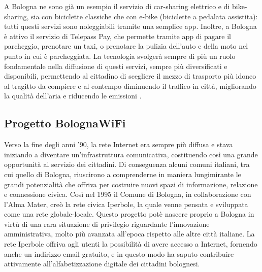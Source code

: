 A Bologna ne sono già un esempio il servizio di car-sharing elettrico e di bike-sharing, sia con biciclette classiche che con e-bike (biciclette a pedalata assistita): tutti questi servizi sono noleggiabili tramite una semplice app. Inoltre, a Bologna è attivo il servizio di Telepass Pay, che permette tramite app di pagare il parcheggio, prenotare un taxi, o prenotare la pulizia dell'auto e della moto nel punto in cui è parcheggiata. La tecnologia svolgerà sempre di più un ruolo fondamentale nella diffusione di questi servizi, sempre più diversificati e disponibili, permettendo al cittadino di scegliere il mezzo di trasporto più idoneo al tragitto da compiere e al contempo diminuendo il traffico in città, migliorando la qualità dell'aria e riducendo le emissioni \cite{Bolognatoday_Smart_City}.




\subsection{Progetto BolognaWiFi}
Verso la fine degli anni '90, la rete Internet era sempre più diffusa e stava iniziando a diventare un'infrastruttura comunicativa, costituendo così una grande opportunità al servizio dei cittadini. Di conseguenza alcuni comuni italiani, tra cui quello di Bologna, riuscirono a comprenderne in maniera lungimirante le grandi potenzialità che offriva per costruire nuovi spazi di informazione, relazione e connessione civica.
Così nel 1995 il Comune di Bologna, in collaborazione con l'Alma Mater, creò la rete civica Iperbole, la quale venne pensata e sviluppata come una rete globale-locale. Questo progetto potè nascere proprio a Bologna in virtù di una rara situazione di privilegio riguardante l'innovazione amministrativa, molto più avanzata all'epoca rispetto alle altre città italiane.
La rete Iperbole offriva agli utenti la possibilità di avere accesso a Internet, fornendo anche un indirizzo email gratuito, e in questo modo ha saputo contribuire attivamente all'alfabetizzazione digitale dei cittadini bolognesi.

